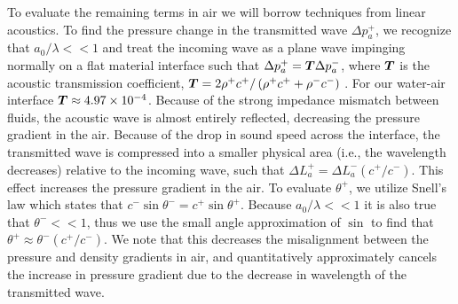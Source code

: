 To evaluate the remaining terms in air we will borrow techniques from
linear acoustics. To find the pressure change in the transmitted wave
$\Delta p_a^+$, we recognize that $a_0/\lambda<<1$ and treat the
incoming wave as a plane wave impinging normally on a flat material
interface such that $\Delta p_a^+=\boldsymbol{T} \Delta p_a^-$, where $\boldsymbol{T}$
is the acoustic transmission coefficient,
$\boldsymbol{T}=2\rho^+ c^+/\left(\rho^+ c^+ + \rho^- c^- \right)$
\citep{Kinsler1982}. For our water-air interface
$\boldsymbol{T}\approx4.97\times10^{-4}$. Because of the strong impedance
mismatch between fluids, the acoustic wave is almost entirely
reflected, decreasing the pressure gradient in the air. Because of the
drop in sound speed across the interface, the transmitted wave is
compressed into a smaller physical area (i.e., the wavelength
decreases) relative to the incoming wave, such that
$\Delta L_a^+=\Delta L_a^- (c^+/c^-)$. This effect increases the
pressure gradient in the air. To evaluate $\theta^+$, we utilize
Snell's law which states that
$c^-\sin{\theta^-}=c^+\sin{\theta^+}$. Because $a_0/\lambda<<1$ it is
also true that $\theta^-<<1$, thus we use the small angle
approximation of $\sin$ to find that
$\theta^+\approx\theta^-(c^+/c^-)$. We note that this decreases the
misalignment between the pressure and density gradients in air, and
quantitatively approximately cancels the increase in pressure gradient
due to the decrease in wavelength of the transmitted wave.

